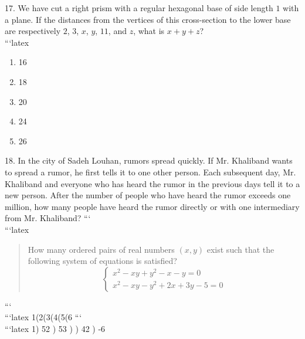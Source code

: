 17. We have cut a right prism with a regular hexagonal base of side length $1$ with a plane. If the distances from the vertices of this cross-section to the lower base are respectively $2$, $3$, $x$, $y$, $11$, and $z$, what is $x + y + z$?
\\
```latex
\begin{enumerate}
    \item 16
    \item 18
    \item 20
    \item 24
    \item 26
\end{enumerate}

18. In the city of Sadeh Louhan, rumors spread quickly. If Mr. Khaliband wants to spread a rumor, he first tells it to one other person. Each subsequent day, Mr. Khaliband and everyone who has heard the rumor in the previous days tell it to a new person. After the number of people who have heard the rumor exceeds one million, how many people have heard the rumor directly or with one intermediary from Mr. Khaliband?
```
\\
```latex
\begin{quote}
How many ordered pairs of real numbers $(x, y)$ exist such that the following system of equations is satisfied?
\[
\begin{cases} 
x^2 - xy + y^2 - x - y = 0 \\
x^2 - xy - y^2 + 2x + 3y - 5 = 0 
\end{cases}
\]
\end{quote}
```
\\
```latex
1(2(3(4(5(6
```
\\
```latex
1) 52 ) 53 )  ) 42 ) -6  

